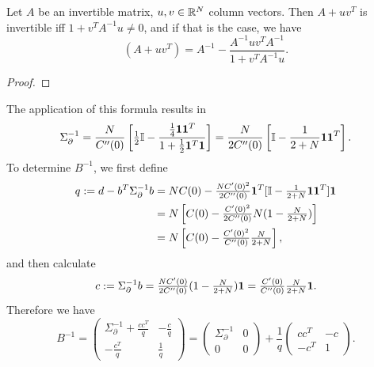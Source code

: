 \begin{lemma}
	Let \(A\) be an invertible matrix, \(u,v\in\mathbb{R}^N\) column vectors.
	Then \(A+ uv^T\) is invertible iff \(1+v^T A^{-1}u \neq 0\), and if that is
	the case, we have
	\[
		(A+uv^T) = A^{-1} - \frac{A^{-1}u v^T A^{-1}}{1+v^T A^{-1}u}.
	\]
\end{lemma}
\begin{proof}
\end{proof}

The application of this formula results in
\begin{equation}\label{eq: sigma_partial inverse}
	\Sigma_\partial^{-1}
	= \frac{N}{C''(0)}\left[
		\tfrac12\mathbb{I} - \frac{\tfrac14\mathbf{1}\mathbf{1}^T}{1+\tfrac12\mathbf{1}^T\mathbf{1}}
	\right]
	= \frac{N}{2C''(0)}\left[
		\mathbb{I} - \frac{1}{2+N}\mathbf{1}\mathbf{1}^T
	\right].
\end{equation}
To determine \(B^{-1}\), we first define
\begin{align*}
	q := d - b^T \Sigma_\partial^{-1}b
	&= NC(0) - \tfrac{NC'(0)^2}{2C''(0)}\mathbf{1}^T
	[\mathbb{I}-\tfrac1{2+N}\mathbf{1}\mathbf{1}^T]\mathbf{1}\\
	&= N\left[
		C(0) - \tfrac{C'(0)^2}{2C''(0)}
		N( 1-\tfrac{N}{2+N} )
	\right]\\
	&= N\left[
		C(0) - \tfrac{C'(0)^2}{C''(0)}
		\tfrac{N}{2+N}
	\right],
\end{align*}
and then calculate
\begin{equation}\label{eq: definition of c=sigma_partial^{-1} b}
	c:=\Sigma_\partial^{-1}b
	= \tfrac{\dimension\sqC'(0)}{2\sqC''(0)}( 1 - \tfrac{\dimension}{2+\dimension} )\ones
	= \tfrac{\sqC'(0)}{\sqC''(0)}\tfrac{\dimension}{2+\dimension}\ones.
\end{equation}
Therefore we have
\begin{equation}\label{eq: inv B split}
	B^{-1} = \begin{pmatrix}
		\Sigma_\partial^{-1}	+ \frac{cc^T}{q} & - \frac{c}{q}\\
		-\frac{c^T}{q} & \frac1q
	\end{pmatrix}
	= \begin{pmatrix}
		\Sigma_\partial^{-1} & 0 \\
		0 & 0
	\end{pmatrix}
	+ \frac1q \begin{pmatrix}
		cc^T & -c\\
		-c^T & 1
	\end{pmatrix}.
\end{equation}

